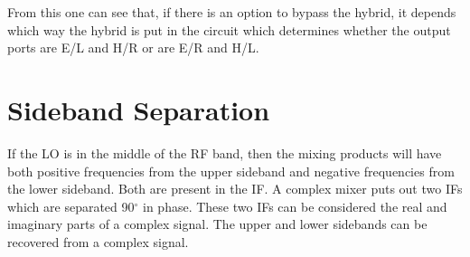 \documentclass[letterpaper,11pt]{book}
\begin{document}
From this one can see that, if there is an option to bypass the hybrid, it 
depends which way the hybrid is put in the 
circuit which determines whether the output ports are E/L and H/R or are
E/R and H/L.

\chapter{Sideband Separation}

If the LO is in the middle of the RF band, then the mixing products will have
both positive frequencies from the upper sideband and negative frequencies from
the lower sideband. Both are present in the IF.  A complex mixer puts out
two IFs which are separated 90$^{\circ}$ in phase.  These two IFs can be
considered the real and imaginary parts of a complex signal. The upper and
lower sidebands can be recovered from a complex signal.
\end{document}
